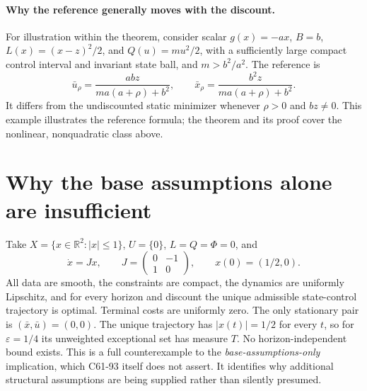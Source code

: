 \documentclass[11pt,a4paper]{article}
\newcommand{\R}{\mathbb R}
\begin{document}
\paragraph{Why the reference generally moves with the discount.}
For illustration within the theorem, consider scalar
$g(x)=-ax$, $B=b$, $L(x)=(x-z)^2/2$, and $Q(u)=mu^2/2$, with a sufficiently
large compact control interval and invariant state ball, and $m>b^2/a^2$.
The reference is
\[
 \bar u_\rho=\frac{abz}{ma(a+\rho)+b^2},\qquad
 \bar x_\rho=\frac{b^2z}{ma(a+\rho)+b^2}.
\]
It differs from the undiscounted static minimizer whenever
$\rho>0$ and $bz\ne0$. This example illustrates the reference formula;
the theorem and its proof cover the nonlinear, nonquadratic class above.

\section{Why the base assumptions alone are insufficient}
Take $X=\{x\in\R^2:|x|\leq1\}$, $U=\{0\}$, $L=Q=\Phi=0$, and
\[
 \dot x=Jx,\qquad
 J=\begin{pmatrix}0&-1\\1&0\end{pmatrix},\qquad x(0)=(1/2,0).
\]
All data are smooth, the constraints are compact, the dynamics are
uniformly Lipschitz, and for every horizon and discount the unique
admissible state-control trajectory is optimal. Terminal costs are
uniformly zero. The only stationary pair is $(\bar x,\bar u)=(0,0)$.
The unique trajectory has $|x(t)|=1/2$ for every $t$, so for
$\varepsilon=1/4$ its unweighted exceptional set has measure $T$.
No horizon-independent bound exists. This is a full counterexample to
the \emph{base-assumptions-only} implication, which C61-93 itself does
not assert. It identifies why additional structural assumptions are
being supplied rather than silently presumed.
\end{document}
